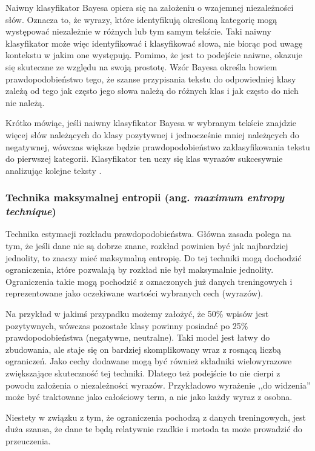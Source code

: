 Naiwny klasyfikator Bayesa opiera się na założeniu o wzajemnej niezależności
słów. Oznacza to, że wyrazy, które identyfikują określoną kategorię mogą występować
niezależnie w różnych lub tym samym tekście. Taki naiwny klasyfikator może więc 
identyfikować i klasyfikować słowa, nie biorąc pod uwagę kontekstu w jakim one
występują. Pomimo, że jest to podejście naiwne, okazuje się skuteczne ze względu
na swoją prostotę. Wzór Bayesa określa bowiem prawdopodobieństwo tego, że szanse
przypisania tekstu do odpowiedniej klasy zależą od tego jak często jego słowa
należą do różnych klas i jak często do nich nie należą.

Krótko mówiąc, jeśli naiwny klasyfikator Bayesa w wybranym tekście znajdzie więcej
słów należących do klasy pozytywnej i jednocześnie mniej należących do negatywnej,
wówczas większe będzie prawdopodobieństwo zaklasyfikowania tekstu do pierwszej
kategorii. Klasyfikator ten uczy się klas wyrazów sukcesywnie analizując
kolejne teksty \cite{tomanekSentyment}.



\subsubsection{Technika maksymalnej entropii (ang. \textit{maximum entropy technique})}
Technika estymacji rozkładu prawdopodobieństwa. Główna zasada polega na tym,
że jeśli dane nie są dobrze znane, rozkład powinien być jak najbardziej jednolity,
to znaczy mieć maksymalną entropię. Do tej techniki mogą dochodzić ograniczenia,
które pozwalają by rozkład nie był maksymalnie jednolity. Ograniczenia
takie mogą pochodzić z oznaczonych już danych treningowych i reprezentowane jako
oczekiwane wartości wybranych cech (wyrazów). 

Na przykład w jakimś przypadku
możemy założyć, że 50\% wpisów jest pozytywnych, wówczas pozostałe klasy
powinny posiadać po 25\% prawdopodobieństwa (negatywne, neutralne).
Taki model jest łatwy do zbudowania, ale staje się on bardziej skomplikowany
wraz z rosnącą liczbą ograniczeń. Jako cechy dodawane mogą być również
składniki wielowyrazowe zwiększające skuteczność tej techniki. Dlatego też
podejście to nie cierpi z powodu założenia o niezależności wyrazów.
Przykładowo wyrażenie ,,do widzenia'' może być traktowane jako całościowy term,
a nie jako każdy wyraz z osobna.

Niestety w związku z tym, że ograniczenia pochodzą z danych treningowych,
jest duża szansa, że dane te będą relatywnie rzadkie i metoda ta może prowadzić
do przeuczenia.


